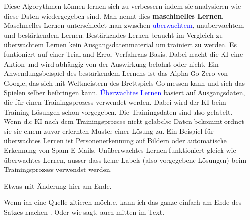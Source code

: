 \documentclass{report}
\begin{document}
Diese Algorythmen können lernen sich zu verbessern indem sie analysieren wie diese Daten wiedergegeben sind. Man nennt dies \textbf{maschinelles Lernen}.
Maschinelles Lernen unterschiedet man zwischen \textcolor{blue}{überwachtem}, unüberwachtem und bestärkendem Lernen. Bestärkendes Lernen braucht im Vergleich zu
überwachtem Lernen kein Ausgangsdatenmaterial um trainiert zu werden. Es funtioniert auf einer Trial-and-Error-Verfahrens Basis. Dabei macht die KI
eine Aktion und wird abhängig von der Auswirkung belohnt oder nicht. Ein Anwendungsbeispiel des bestärkendem Lernens ist das Alpha Go Zero von Google, das 
sich mit Weltmeistern des Brettspiels Go messen kann und sich das Spielen selber beibringen kann.
\textcolor{blue}{Überwachtes Lernen} basiert auf Ausgangsdaten, die für einen Trainingsprozess verwendet werden.\citep{bigdatainsider} Dabei wird der KI beim Training Lösungen  
schon vorgegeben. Die Trainingsdaten sind also gelabelt. Wenn die KI nach dem Trainingsprozess nicht gelabelte Daten bekommt ordnet sie sie einem zuvor erlernten
Muster einer Lösung zu. Ein Beispiel für überwachtes Lernen ist Personenerkennung auf Bildern oder automatische Erkennung von Spam E-Mails.
Unüberwachtes Lernen funktioniert gleich wie überwachtes Lernen, ausser dass keine Labels (also vorgegebene Lösungen) beim Trainingsprozess verwendet werden.



Etwas mit Änderung hier am Ende.

Wenn ich eine Quelle zitieren möchte, kann ich das ganze einfach am Ende des Satzes machen \citep{example}. Oder wie \citet{example} sagt, auch mitten im Text.

\printbibliography
\end{document}

